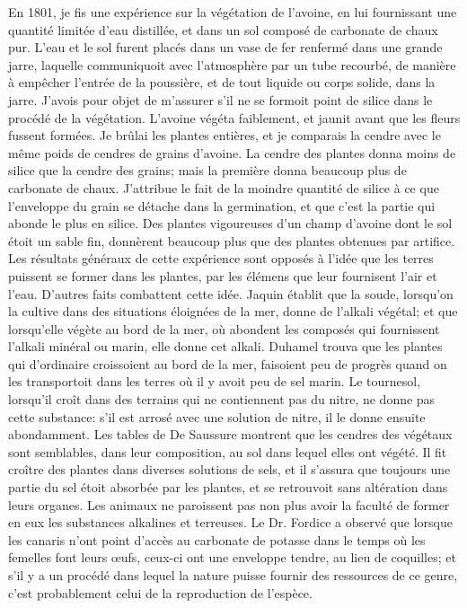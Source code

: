 En 1801, je fis une expérience sur la végétation de l'avoine, en lui fournissant une quantité limitée d'eau distillée, et dans un sol composé de carbonate de chaux pur. L'eau et le sol furent placés dans un vase de fer renfermé dans une grande jarre, laquelle communiquoit avec l'atmosphère par un tube recourbé, de manière à empêcher l'entrée de la poussière, et de tout liquide ou corps solide, dans la jarre. J'avois pour objet de m'assurer s'il ne se formoit point de silice dans le procédé de la végétation. L'avoine végéta faiblement, et jaunit avant que les fleurs fussent formées. Je brûlai les plantes entières, et je comparais la cendre avec le même poids de cendres de grains d'avoine. La cendre des plantes donna moins de silice que la cendre des grains; mais la première donna beaucoup plus de carbonate de chaux.\setcounter{page}{213} J'attribue le fait de la moindre quantité de silice à ce que l'enveloppe du grain se détache dans la germination, et que c'est la partie qui abonde le plus en silice. Des plantes vigoureuses d'un champ d'avoine dont le sol étoit un sable fin, donnèrent beaucoup plus que des plantes obtenues par artifice. Les résultats généraux de cette expérience sont opposés à l'idée que les terres puissent se former dans les plantes, par les élémens que leur fournisent l'air et l'eau. D'autres faits combattent cette idée. Jaquin établit que la soude, lorsqu'on la cultive dans des situations éloignées de la mer, donne de l'alkali végétal; et que lorsqu'elle végète au bord de la mer, où abondent les composés qui fournissent l'alkali minéral ou marin, elle donne cet alkali. Duhamel trouva que les plantes qui d'ordinaire croissoient au bord de la mer, faisoient peu de progrès quand on les transportoit dans les terres où il y avoit peu de sel marin. Le tournesol, lorsqu'il croît dans des terrains qui ne contiennent pas du nitre, ne donne pas cette substance: s'il est arrosé avec une solution de nitre, il le donne ensuite abondamment. Les tables de De Saussure montrent que les\setcounter{page}{214} cendres des végétaux sont semblables, dans leur composition, au sol dans lequel elles ont végété. Il fit croître des plantes dans diverses solutions de sels, et il s'assura que toujours une partie du sel étoit absorbée par les plantes, et se retrouvoit sans altération dans leurs organes.
Les animaux ne paroissent pas non plus avoir la faculté de former en eux les substances alkalines et terreuses. Le Dr. Fordice a observé que lorsque les canaris n'ont point d'accès au carbonate de potasse dans le temps où les femelles font leurs œufs, ceux-ci ont une enveloppe tendre, au lieu de coquilles; et s'il y a un procédé dans lequel la nature puisse fournir des ressources de ce genre, c'est probablement celui de la reproduction de l'espèce.
